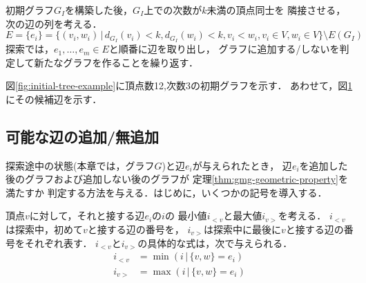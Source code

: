初期グラフ$G_I$を構築した後，$G_I$上での次数が$k$未満の頂点同士を
隣接させる，次の辺の列を考える．
\[ E = \{e_i\} = \{(v_i,w_i)\,|\,
d_{G_I}(v_i)<k,d_{G_I}(w_i)<k,v_i<w_i,v_i\in V,w_i\in V\}
\setminus E(G_I) \]
探索では，$e_1,\ldots,e_m\in E$と順番に辺を取り出し，
グラフに追加する/しないを判定して新たなグラフを作ることを繰り返す．

\begin{example}
  図\ref{fig:initial-tree-example}に頂点数12,次数3の初期グラフを示す．
  あわせて，図\ref{fig:feasible-edges-example}にその候補辺を示す．
  \begin{figure}
    \centering
    \begin{minipage}{.4\columnwidth}
      \def\svgwidth{\textwidth}
      
      \label{fig:initial-tree-example}
    \end{minipage}
    \hfill
    \begin{minipage}{.4\columnwidth}
      \def\svgwidth{\textwidth}
      
      \label{fig:feasible-edges-example}
    \end{minipage}
  \end{figure}
\end{example}

\subsection{可能な辺の追加/無追加}
\label{subsect:feasible-edge-(no)-addition}
探索途中の状態(本章では，グラフ$G$)と辺$e_i$が与えられたとき，
辺$e_i$を追加した後のグラフおよび追加しない後のグラフが
定理\ref{thm:gmg-geometric-property}を満たすか
判定する方法を与える．はじめに，いくつかの記号を導入する．
\begin{definition}
  頂点$v$に対して，それと接する辺$e_i$の$i$の
  最小値$i_{<v}$と最大値$i_{v>}$を考える．
  $i_{<v}$は探索中，初めて$v$と接する辺の番号を，
  $i_{v>}$は探索中に最後に$v$と接する辺の番号をそれぞれ表す．
  $i_{<v}$と$i_{v>}$の具体的な式は，次で与えられる．
  \begin{equation}
    \label{eq:frontier}
    \begin{aligned}
    i_{<v} &= \min(i\,|\,\{v,w\}=e_i) \\
    i_{v>} &= \max(i\,|\,\{v,w\}=e_i)
    \end{aligned}
  \end{equation}
\end{definition}

